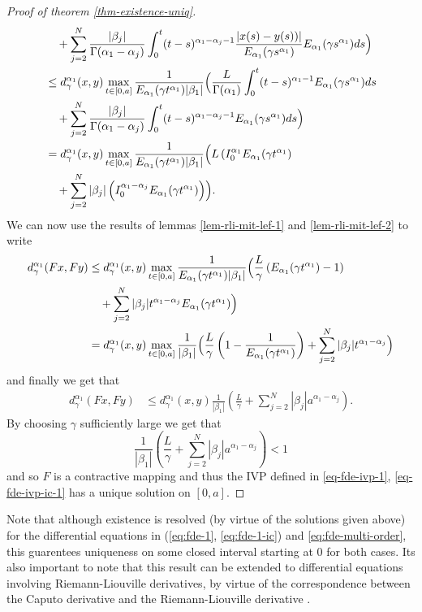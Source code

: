 \begin{proof}[Proof of theorem \ref{thm-existence-uniq}]
\begin{align*}
			& \ \ \ + \sum_{j=2}^N \frac{|\beta_j|}{\Gamma(\alpha_1 - \alpha_j)} \int_0^t (t-s)^{\alpha_1 - \alpha_j - 1}\frac{|x(s) - y(s))|}{E_{\alpha_1}(\gamma s^{\alpha_1})}E_{\alpha_1}(\gamma s^{\alpha_1}) ds \Bigr) \\
			&\leq d_\gamma^{\alpha_1}(x,y) \max_{t \in [0, a]} \frac{1}{E_{\alpha_1}(\gamma t^{\alpha_1})|\beta_1|} \Bigl(
			\frac{L}{\Gamma(\alpha_1)}\int_0^t (t-s)^{\alpha_1 - 1} E_{\alpha_1}(\gamma s^{\alpha_1}) ds \\
			& \ \ \ + \sum_{j=2}^N \frac{|\beta_j|}{\Gamma(\alpha_1 - \alpha_j)} \int_0^t (t-s)^{\alpha_1 - \alpha_j - 1}E_{\alpha_1}(\gamma s^{\alpha_1}) ds \Bigr) \\
			&= d_\gamma^{\alpha_1}(x,y) \max_{t \in [0, a]} \frac{1}{E_{\alpha_1}(\gamma t^{\alpha_1})|\beta_1|} \Bigl(
			L \left( I_{0}^{\alpha_1} E_{\alpha_1}(\gamma t^{\alpha_1} \right) \\
			& \ \ \ + \sum_{j=2}^N |\beta_j| \left( I_{0}^{\alpha_1 - \alpha_j} E_{\alpha_1}(\gamma t^{\alpha_1}) \right) \Bigr). \\
	\end{align*}
	We can now use the results of lemmas \ref{lem-rli-mit-lef-1} and \ref{lem-rli-mit-lef-2} to write
	\begin{align*}
		d_\gamma^{\alpha_1}(Fx,Fy) &\leq d_\gamma^{\alpha_1}(x,y) \max_{t \in [0, a]} \frac{1}{E_{\alpha_1}(\gamma t^{\alpha_1})|\beta_1|} \Bigl(
			\frac{L}{\gamma}\left( E_{\alpha_1}(\gamma t^{\alpha_1}) - 1 \right) \\
			& \ \ \ + \sum_{j=2}^N |\beta_j| t^{\alpha_1 - \alpha_j} E_{\alpha_1}(\gamma t^{\alpha_1}) \Bigr) \\
			&= d_\gamma^{\alpha_1}(x,y) \max_{t \in [0, a]} \frac{1}{|\beta_1|} \Bigl(
			\frac{L}{\gamma}\left( 1- \frac{1}{E_{\alpha_1}(\gamma t^{\alpha_1})} \right) + \sum_{j=2}^N |\beta_j| t^{\alpha_1 - \alpha_j}\Bigr) \\
	\end{align*}
	and finally we get that 
	\begin{align*}
		d_\gamma^{\alpha_1}(Fx,Fy) &\leq d_\gamma^{\alpha_1}(x,y) \frac{1}{|\beta_1|}\left( \frac{L}{\gamma} + \sum_{j=2}^N |\beta_j| a^{\alpha_1 - \alpha_j} \right).
	\end{align*}
	By choosing $ \gamma $ sufficiently large we get that 
	$$
		\frac{1}{|\beta_1|}\left( \frac{L}{\gamma} + \sum_{j=2}^N |\beta_j| a^{\alpha_1 - \alpha_j} \right) < 1
	$$
	and so $ F $ is a contractive mapping and thus the IVP defined in \eqref{eq-fde-ivp-1}, \eqref{eq-fde-ivp-ic-1} has a unique solution on $ [0, a] $.
\end{proof}

Note that although existence is resolved (by virtue of the solutions given above)
for the differential equations in (\ref{eq:fde-1}, \ref{eq:fde-1-ic}) and \ref{eq:fde-multi-order}, this 
guarentees uniqueness on some closed interval starting at $ 0 $ for both cases. Its also important
to note that this result can be extended to differential equations involving Riemann-Liouville derivatives, by 
virtue of the correspondence between the Caputo derivative and the Riemann-Liouville derivative \cite{Podlubny1999}. 

